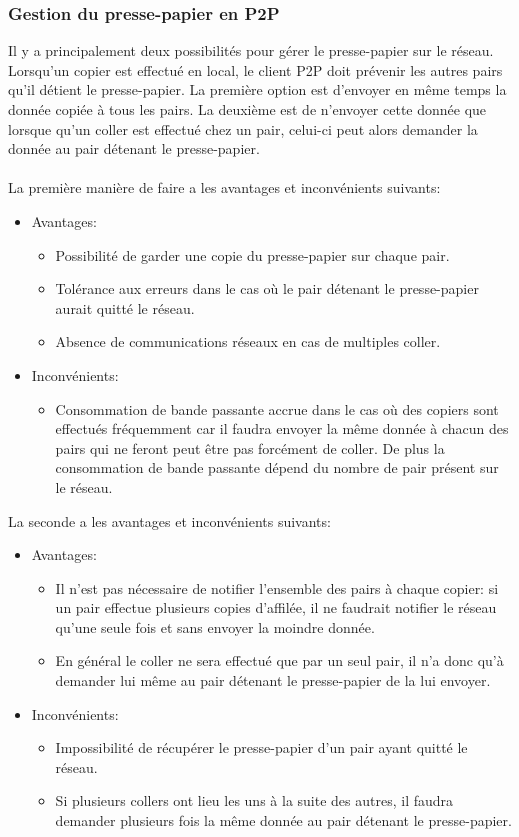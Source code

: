 \subsubsection*{Gestion du presse-papier en P2P}
Il y a principalement deux possibilités pour gérer le presse-papier
sur le réseau. Lorsqu'un copier est effectué en local, le client P2P
doit prévenir les autres pairs qu'il détient le presse-papier.
La première option est d'envoyer en même temps la donnée copiée à tous les
pairs. La deuxième est de n'envoyer cette donnée que lorsque qu'un coller
est effectué chez un pair, celui-ci peut alors demander la donnée au pair
détenant le presse-papier.\\\\
La première manière de faire a les avantages et inconvénients suivants:
\begin{itemize}
\item Avantages:
  \begin{itemize}
  \item Possibilité de garder une copie du presse-papier sur chaque pair.
  \item Tolérance aux erreurs dans le cas où le pair détenant le presse-papier
    aurait quitté le réseau.
  \item Absence de communications réseaux en cas de multiples coller.
  \end{itemize}
\item Inconvénients:
  \begin{itemize}
  \item Consommation de bande passante accrue dans le cas où des copiers
    sont effectués fréquemment car il faudra envoyer la même donnée à chacun
    des pairs qui ne feront peut être pas forcément de coller. De plus la
    consommation de bande passante dépend du nombre de pair présent sur le
    réseau.
  \end{itemize}
\end{itemize}
La seconde a les avantages et inconvénients suivants:
\begin{itemize}
\item Avantages:
  \begin{itemize}
  \item Il n'est pas nécessaire de notifier l'ensemble des pairs à chaque
    copier: si un pair effectue plusieurs copies d'affilée, il ne faudrait
    notifier le réseau qu'une seule fois et sans envoyer la moindre donnée.
  \item En général le coller ne sera effectué que par un seul pair,
    il n'a donc qu'à demander lui même au pair détenant le presse-papier
    de la lui envoyer.
  \end{itemize}
\item Inconvénients:
  \begin{itemize}
  \item Impossibilité de récupérer le presse-papier d'un pair ayant quitté
    le réseau.
  \item Si plusieurs collers ont lieu les uns à la suite des autres, il faudra
    demander plusieurs fois la même donnée au pair détenant le presse-papier.\\
  \end{itemize}
\end{itemize}

